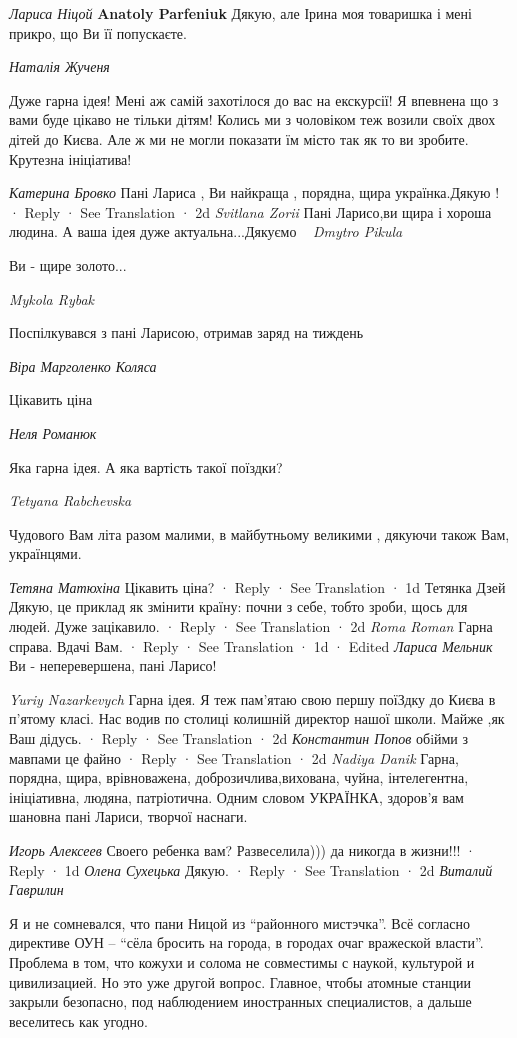\emph{Лариса Ніцой}
\textbf{Anatoly Parfeniuk} Дякую, але Ірина моя товаришка і мені прикро, що Ви її попускаєте.

\emph{Наталія Жученя}

Дуже гарна ідея! Мені аж самій захотілося до вас на екскурсії! Я впевнена що з
вами буде цікаво не тільки дітям! Колись ми з чоловіком теж возили своїх двох
дітей до Києва. Але ж ми не могли показати їм місто так як то ви зробите.
Крутезна ініціатива!

\emph{Катерина Бровко}
Пані Лариса , Ви найкраща , порядна, щира українка.Дякую !
 · Reply · See Translation · 2d
\emph{Svitlana Zorii}
Пані Ларисо,ви щира і хороша людина.
А ваша ідея дуже актуальна...Дякуємо💛💕💙
\emph{Dmytro Pikula}

Ви - щире золото...

\emph{Mykola Rybak}

Поспілкувався з пані Ларисою, отримав заряд на тиждень💙💛

\emph{Віра Марголенко Коляса}

Цікавить ціна

\emph{Неля Романюк}

Яка гарна ідея. А яка вартість такої поїздки?

\emph{Tetyana Rabchevska}

Чудового Вам літа разом малими, в майбутньому великими , дякуючи також Вам, українцями.

\emph{Тетяна Матюхіна}
Цікавить ціна?
 · Reply · See Translation · 1d
Тетянка Дзей
Дякую, це приклад як змінити країну: почни з себе, тобто зроби, щось для людей. Дуже зацікавило.
 · Reply · See Translation · 2d
\emph{Roma Roman}
Гарна справа. Вдачі Вам.
 · Reply · See Translation · 1d · Edited
\emph{Лариса Мельник}
Ви - неперевершена, пані Ларисо!

\emph{Yuriy Nazarkevych}
Гарна ідея. Я теж пам'ятаю свою першу поїЗдку до Києва в п'ятому класі. Нас водив по столиці колишній директор нашої школи. Майже ,як Ваш дідусь.
 · Reply · See Translation · 2d
\emph{Константин Попов}
обiйми з мавпами це файно
 · Reply · See Translation · 2d
\emph{Nadiya Danik}
Гарна, порядна, щира, врівноважена, доброзичлива,вихована, чуйна, інтелегентна, ініціативна, людяна, патріотична.
Одним словом УКРАЇНКА, здоров'я вам шановна пані Лариси, творчої наснаги.

\emph{Игорь Алексеев}
Своего ребенка вам? Развеселила))) да никогда в жизни!!!
 · Reply · 1d
\emph{Олена Сухецька}
Дякую.
 · Reply · See Translation · 2d
\emph{Виталий Гаврилин}

Я и не сомневался, что пани Ницой из \enquote{районного мистэчка}. Всё согласно
директиве ОУН -- \enquote{сёла бросить на города, в городах очаг вражеской
власти}.  Проблема в том, что кожухи и солома не совместимы с наукой, культурой
и цивилизацией. Но это уже другой вопрос. Главное, чтобы атомные станции
закрыли безопасно, под наблюдением иностранных специалистов, а дальше
веселитесь как угодно.


